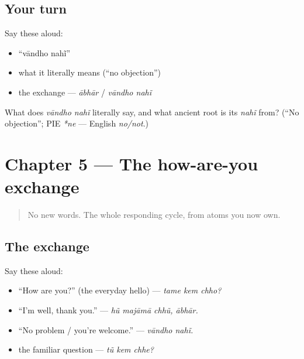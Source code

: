 \subsection*{Your turn}
Say these aloud:

\begin{itemize}
\raggedright
  \item \textquotedblleft{}vāndho nahĩ\textquotedblright{}
  \item what it literally means (\textquotedblleft{}no objection\textquotedblright{})
  \item the exchange — \emph{ābhār} / \emph{vāndho nahĩ}
\end{itemize}

\begin{tcolorbox}[breakable,colback=teal!4,colframe=teal!35!black,title={Before you move on}]
What does \emph{vāndho nahĩ} literally say, and what ancient root is its \emph{nahĩ} from? (\textquotedblleft{}No objection\textquotedblright{}; PIE \emph{*ne} — English \emph{no/not}.)
\end{tcolorbox}
\section[Practice]{Chapter 5 — The how-are-you exchange}

\label{lesson:GU-C03-practice}



\begin{quote}
No new words. The whole responding cycle, from atoms you now own.
\end{quote}

\subsection*{The exchange}
Say these aloud:

\begin{itemize}
\raggedright
  \item \textquotedblleft{}How are you?\textquotedblright{} (the everyday hello) — \emph{tame kem chho?}
  \item \textquotedblleft{}I'm well, thank you.\textquotedblright{} — \emph{hũ majāmā chhũ, ābhār.}
  \item \textquotedblleft{}No problem / you're welcome.\textquotedblright{} — \emph{vāndho nahĩ.}
  \item the familiar question — \emph{tũ kem chhe?}
\end{itemize}

